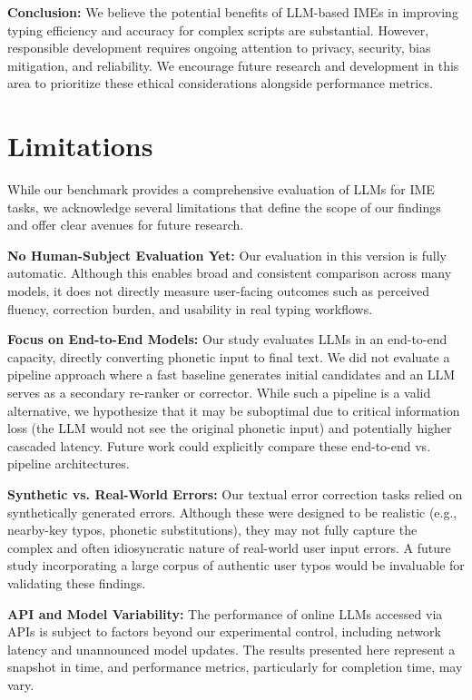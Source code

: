 \documentclass[10pt, a4paper]{article}
\begin{document}
\textbf{Conclusion:} We believe the potential benefits of LLM-based IMEs in improving typing efficiency and accuracy for complex scripts are substantial. However, responsible development requires ongoing attention to privacy, security, bias mitigation, and reliability. We encourage future research and development in this area to prioritize these ethical considerations alongside performance metrics.


\section{Limitations}

While our benchmark provides a comprehensive evaluation of LLMs for IME tasks, we acknowledge several limitations that define the scope of our findings and offer clear avenues for future research.

\textbf{No Human-Subject Evaluation Yet:} Our evaluation in this version is fully automatic. Although this enables broad and consistent comparison across many models, it does not directly measure user-facing outcomes such as perceived fluency, correction burden, and usability in real typing workflows.

\textbf{Focus on End-to-End Models:} Our study evaluates LLMs in an end-to-end capacity, directly converting phonetic input to final text. We did not evaluate a pipeline approach where a fast baseline generates initial candidates and an LLM serves as a secondary re-ranker or corrector. While such a pipeline is a valid alternative, we hypothesize that it may be suboptimal due to critical information loss (the LLM would not see the original phonetic input) and potentially higher cascaded latency. Future work could explicitly compare these end-to-end vs. pipeline architectures.

\textbf{Synthetic vs. Real-World Errors:} Our textual error correction tasks relied on synthetically generated errors. Although these were designed to be realistic (e.g., nearby-key typos, phonetic substitutions), they may not fully capture the complex and often idiosyncratic nature of real-world user input errors. A future study incorporating a large corpus of authentic user typos would be invaluable for validating these findings.

\textbf{API and Model Variability:} The performance of online LLMs accessed via APIs is subject to factors beyond our experimental control, including network latency and unannounced model updates. The results presented here represent a snapshot in time, and performance metrics, particularly for completion time, may vary.
\end{document}
